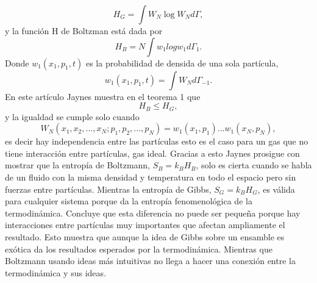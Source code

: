 \begin{equation}
H_{G}= \int W_{N} \log W_{N} d \Gamma,
\end{equation}
y la función H de Boltzman está dada por 
\begin{equation}
H_{B}=N \int w_{1} log w_{1} d\Gamma_{1}.
\end{equation}
Donde $w_{1}(x_{1},p_{1},t)$ es la probabilidad de densida de una sola partícula, 
\begin{equation}
w_{1}(x_{1},p_{1},t)= \int W_{N} d \Gamma_{-1}.
\end{equation}
En este artículo Jaynes muestra en el teorema 1 que 
\begin{equation}
H_{B} \leq H_{G},
\end{equation}
y la igualdad se cumple solo cuando 
\begin{equation}
W_{N}(x_{1},x_{2},...,x_{N};p_{1},p_{2},...,p_{N})=w_{1}(x_{1},p_{1})...w_{1}(x_{N},p_{N}),
\end{equation}
es decir hay independencia entre las partículas esto es el caso para un gas que no tiene interacción entre partículas, gas ideal. Gracias a esto Jaynes prosigue con mostrar que la entropía de Boltzmann, $S_{B}=k_{B}H_{B}$, solo es cierta cuando se habla de un fluido con la misma densidad y temperatura en todo el espacio pero sin fuerzas entre partículas. Mientras la entropía de Gibbs, $S_{G}=k_{B}H_{G}$, es válida para cualquier sistema porque da la entropía fenomenológica de la termodinámica. Concluye que esta diferencia no puede ser pequeña porque hay interacciones entre partículas muy importantes que afectan ampliamente el resultado. Esto muestra que aunque la idea de Gibbs sobre un ensamble es exótica da los resultados esperados por la termodinámica. Mientras que Boltzmann usando ideas más intuitivas no llega a hacer una conexión entre la termodinámica y sus ideas. 
\\
